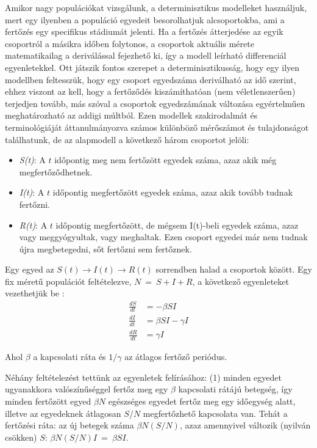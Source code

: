     Amikor nagy populációkat vizsgálunk, a determinisztikus modelleket használjuk, mert egy ilyenben a populáció egyedeit besorolhatjuk alcsoportokba, ami a fertőzés egy specifikus stádiumát jelenti. Ha a fertőzés átterjedése az egyik csoportról a másikra időben folytonos, a csoportok aktuális mérete matematikailag a deriválással fejezhető ki, így a modell leírható differenciál egyenletekkel. Ott játszik fontos szerepet a determinisztikusság, hogy egy ilyen modellben feltesszük, hogy egy csoport egyedszáma deriválható az idő szerint, ehhez viszont az kell, hogy a fertőződés kiszámíthatóan (nem véletlenszerűen) terjedjen tovább, más szóval a csoportok egyedszámának változása egyértelműen meghatározható az addigi múltból. Ezen modellek szakirodalmát és terminológiáját áttanulmányozva számos különböző mérőszámot és tulajdonságot találhatunk, de az alapmodell a következő három csoportot jelöli:
    \begin{itemize}
      \item \emph{S(t)}: A $t$ időpontig meg nem fertőzött egyedek száma, azaz akik még megfertőződhetnek.
      \item \emph{I(t)}: A $t$ időpontig megfertőzött egyedek száma, azaz akik tovább tudnak fertőzni.
      \item \emph{R(t)}: A $t$ időpontig megfertőzött, de mégsem I(t)-beli egyedek száma, azaz vagy meggyógyultak, vagy meghaltak. Ezen csoport egyedei már nem tudnak újra megbetegedni, sőt fertőzni sem fertőznek.
    \end{itemize}

    Egy egyed az $S(t) \rightarrow I(t) \rightarrow R(t)$ sorrendben halad a csoportok között. Egy fix méretű populációt feltételezve, $N~=~S+I+R$, a következő egyenleteket vezethetjük be \cite{Contributions_to_the_mathematical_theory_of_epidemics}:
    \begin{align}
      \frac{dS}{dt} &= - \beta S I\\
      \frac{dI}{dt} &= \beta S I - \gamma I\\
      \frac{dR}{dt} &= \gamma I
    \end{align}

    Ahol $\beta$ a kapcsolati ráta és $1/\gamma$ az átlagos fertőző periódus.

    Néhány feltételezést tettünk az egyenletek felírásához: (1) minden egyedet ugyanakkora valószínűséggel fertőz meg egy $\beta$ kapcsolati rátájú betegség, így minden fertőzött egyed $\beta N$ egészséges egyedet fertőz meg egy időegység alatt, illetve az egyedeknek átlagosan $S/N$ megfertőzhető kapcsolata van. Tehát a fertőzési ráta: az új betegek száma $\beta N (S/N)$, azaz amennyivel változik (nyilván csökken) $S$: $\beta N (S/N)I~=~\beta SI$.

